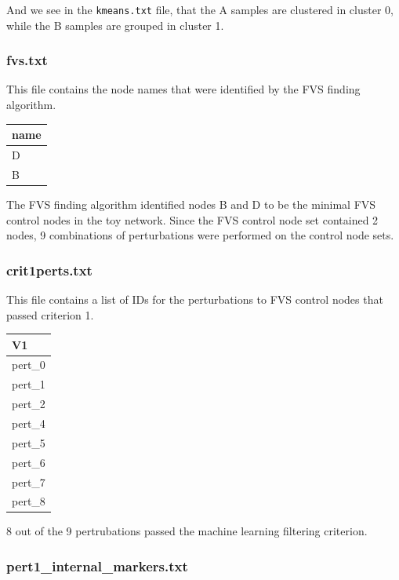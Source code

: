 \documentclass[
]{book}
\begin{document}
And we see in the \texttt{kmeans.txt} file, that the A samples are clustered in cluster 0, while the B samples are grouped in cluster 1.

\hypertarget{section-id}{%
\subsubsection*{fvs.txt}\label{section-id}}

This file contains the node names that were identified by the FVS finding algorithm.

\begin{tabular}{l}
\hline
name\\
\hline
D\\
\hline
B\\
\hline
\end{tabular}

The FVS finding algorithm identified nodes B and D to be the minimal FVS control nodes in the toy network. Since the FVS control node set contained 2 nodes, 9 combinations of perturbations were performed on the control node sets.

\hypertarget{section-id}{%
\subsubsection*{crit1perts.txt}\label{section-id}}

This file contains a list of IDs for the perturbations to FVS control nodes that passed criterion 1.

\begin{tabular}{l}
\hline
V1\\
\hline
pert\_0\\
\hline
pert\_1\\
\hline
pert\_2\\
\hline
pert\_4\\
\hline
pert\_5\\
\hline
pert\_6\\
\hline
pert\_7\\
\hline
pert\_8\\
\hline
\end{tabular}

8 out of the 9 pertrubations passed the machine learning filtering criterion.

\hypertarget{section-id}{%
\subsubsection*{pert1\_internal\_markers.txt}\label{section-id}}
\end{document}
